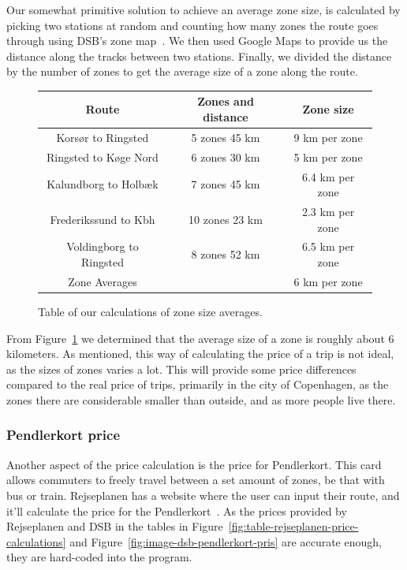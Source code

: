 Our somewhat primitive solution to achieve an average zone size, is calculated by picking two stations at random and
counting how many zones the route goes through using DSB's zone map~\cite{price_zones}.
We then used Google Maps to provide us the distance along the tracks between two stations.
Finally, we divided the distance by the number of zones to get the average size of a zone along the route.

\begin{figure}[H]
    \centering
    \noindent
    \begin{tabular}{ || c | c | c || }
        \hline
        Route & Zones and distance & Zone size \\
        \hline\hline
        Korsør to Ringsted & 5 zones 45 km & 9 km per zone \\
        \hline
        Ringsted to Køge Nord & 6 zones 30 km & 5 km per zone \\
        \hline
        Kalundborg to Holbæk & 7 zones 45 km & 6.4 km per zone \\
        \hline
        Frederikssund to Kbh & 10 zones 23 km & 2.3 km per zone \\
        \hline
        Voldingborg to Ringsted & 8 zones 52 km & 6.5 km per zone \\
        \hline\hline
        Zone Averages & & 6 km per zone \\
        \hline
    \end{tabular}
    \caption{Table of our calculations of zone size averages.}
    \label{fig:table-zone-size-averages}
\end{figure}

From Figure~\ref{fig:table-zone-size-averages} we determined that the average size of a zone is roughly about 6
kilometers.
As mentioned, this way of calculating the price of a trip is not ideal, as the sizes of zones varies a lot.
This will provide some price differences compared to the real price of trips, primarily in the city of Copenhagen,
as the zones there are considerable smaller than outside, and as more people live there.

\subsubsection{Pendlerkort price}

Another aspect of the price calculation is the price for Pendlerkort.
This card allows commuters to freely travel between a set amount of zones, be that with bus or train.
Rejseplanen has a website where the user can input their route, and it'll calculate the price for the
Pendlerkort~\cite{price_calculator}.
As the prices provided by Rejseplanen and DSB in the tables in Figure~\ref{fig:table-rejseplanen-price-calculations} and
Figure~\ref{fig:image-dsb-pendlerkort-pris} are accurate enough, they are hard-coded into the program.

